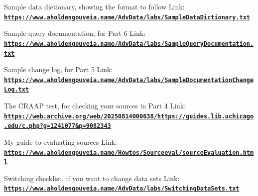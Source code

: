\documentclass[12pt]{article}
\begin{document}
Sample data dictionary, showing the format to follow
Link: \href{https://www.aholdengouveia.name/AdvData/labs/SampleDataDictionary.txt}{\textbf{\nolinkurl{https://www.aholdengouveia.name/AdvData/labs/SampleDataDictionary.txt}}}

Sample query documentation, for Part 6
Link: \href{https://www.aholdengouveia.name/AdvData/labs/SampleQueryDocumentation.txt}{\textbf{\nolinkurl{https://www.aholdengouveia.name/AdvData/labs/SampleQueryDocumentation.txt}}}

Sample change log, for Part 5
Link: \href{https://www.aholdengouveia.name/AdvData/labs/SampleDocumentationChangeLog.txt}{\textbf{\nolinkurl{https://www.aholdengouveia.name/AdvData/labs/SampleDocumentationChangeLog.txt}}}

The CRAAP test, for checking your sources in Part 4
Link: \href{https://web.archive.org/web/20250814000638/https://guides.lib.uchicago.edu/c.php?g=1241077&p=9082343}{\textbf{\nolinkurl{https://web.archive.org/web/20250814000638/https://guides.lib.uchicago.edu/c.php?g=1241077&p=9082343}}}

My guide to evaluating sources
Link: \href{https://www.aholdengouveia.name/Howtos/Sourceeval/sourceEvaluation.html}{\textbf{\nolinkurl{https://www.aholdengouveia.name/Howtos/Sourceeval/sourceEvaluation.html}}}

Switching checklist, if you want to change data sets
Link: \href{https://www.aholdengouveia.name/AdvData/labs/SwitchingDataSets.txt}{\textbf{\nolinkurl{https://www.aholdengouveia.name/AdvData/labs/SwitchingDataSets.txt}}}
\end{document}
